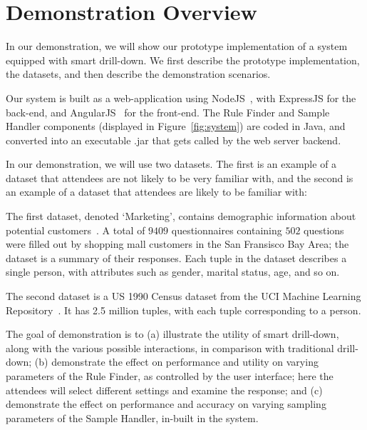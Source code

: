 \vspace{-10pt}
\section{Demonstration Overview} \label{sec:demo} 
In our demonstration, we will show our prototype implementation of a system equipped with smart drill-down. We first describe the prototype implementation, the datasets, and then describe the demonstration scenarios.

 Our system is built as a web-application using NodeJS~\cite{nodejs}, with ExpressJS for the back-end, and AngularJS~\cite{angular} for the front-end. The Rule Finder and Sample Handler components (displayed in Figure~\ref{fig:system}) are coded in Java, and converted into an executable .jar that gets called by the web server backend. 

 In our demonstration, we will use two datasets. The first is an example of a dataset that attendees are not likely to be very familiar with, and the second is an example of a dataset that attendees are likely to be familiar with:

The first dataset, denoted `Marketing', contains demographic information about potential customers~\cite{dataset1}. A total of $9409$ questionnaires containing $502$ questions were filled out by shopping mall customers in the San Fransisco Bay Area; the dataset is a summary of their responses. Each tuple in the dataset describes a single person, with attributes such as gender, marital status, age, and so on. 

The second dataset is a US 1990 Census dataset from the UCI Machine Learning Repository~\cite{uciml}. It has 2.5 million tuples, with each tuple corresponding to a person. %

\vspace{-1pt}
 The goal of demonstration is to (a) illustrate
the utility of smart drill-down, along with the various possible interactions, 
in comparison with traditional drill-down; 
(b) demonstrate the effect on performance and utility on varying parameters of the Rule Finder, as controlled by the user interface; here the attendees will select different settings and examine the response; and
(c) demonstrate the effect on performance and accuracy on varying sampling parameters of the Sample Handler, in-built in the system.   


